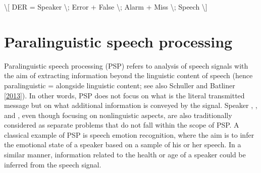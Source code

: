\documentclass[letterpaper,10pt,english]{jupyterBook}
\begin{document}
\sphinxAtStartPar
\textbackslash{}{[} DER = Speaker \textbackslash{}; Error + False \textbackslash{}; Alarm + Miss \textbackslash{}; Speech \textbackslash{}{]}

\sphinxstepscope


\section{Paralinguistic speech processing}
\label{\detokenize{Recognition/Paralinguistic_speech_processing:paralinguistic-speech-processing}}\label{\detokenize{Recognition/Paralinguistic_speech_processing::doc}}
\sphinxAtStartPar
Paralinguistic speech processing (PSP) refers to analysis of speech
signals with the aim of extracting information beyond the linguistic
content of speech (hence paralinguistic = alongside linguistic
content; see also Schuller and Batliner {[}\hyperlink{cite.References:id8}{2013}{]}). In other words, PSP does
not focus on what is the literal transmitted message but on what
additional information is conveyed by the signal. Speaker
{\hyperref[\detokenize{Recognition/Speaker_Diarization::doc}]{}},
{\hyperref[\detokenize{Recognition/Speaker_Recognition_and_Verification::doc}]{}}, and
{\hyperref[\detokenize{Recognition/Speaker_Recognition_and_Verification::doc}]{}}, even though
focusing on non\sphinxhyphen{}linguistic aspects, are also traditionally considered as
separate problems that do not fall within the scope of PSP. A classical
example of PSP is speech emotion recognition, where the aim is to infer
the emotional state of a speaker based on a sample of his or her speech.
In a similar manner, information related to the health or age of a
speaker could be inferred from the speech signal.
\end{document}
